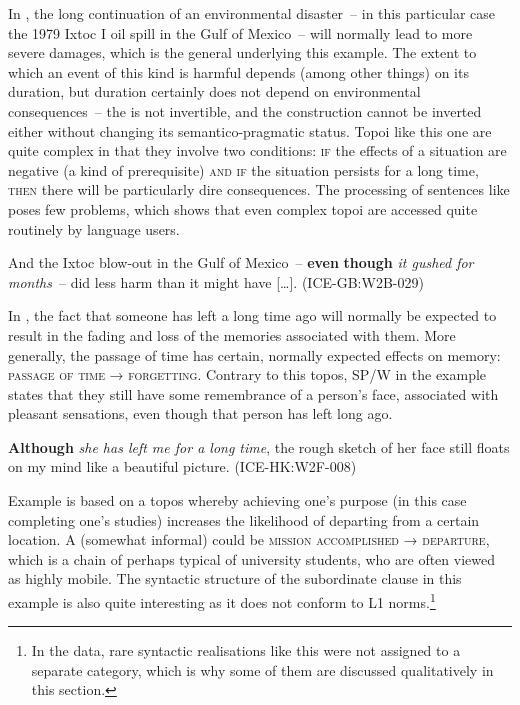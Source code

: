 In , the long continuation of an environmental disaster~– in this particular case the 1979 Ixtoc I oil spill in the Gulf of Mexico~– will normally lead to more severe damages, which is the general  underlying this example. The extent to which an event of this kind is harmful depends (among other things) on its duration, but duration certainly does not depend on environmental consequences~– the  is not invertible, and the construction cannot be inverted either without changing its semantico-pragmatic status. Topoi like this one are quite complex in that they involve two conditions: \textsc{if} the effects of a situation are negative (a kind of prerequisite) \textsc{and} \textsc{if} the situation persists for a long time, \textsc{then} there will be particularly dire consequences. The processing of sentences like  poses few problems, which shows that even complex topoi are accessed quite routinely by language users.

\ea\label{ex:41}   \label{bkm:Ref487277467}And the Ixtoc blow-out in the Gulf of Mexico~– \textbf{even} \textbf{though} \textit{it gushed for months}~– did less harm than it might have […]. (ICE-GB:W2B-029)
\z

In , the fact that someone has left a long time ago will normally be expected to result in the fading and loss of the memories associated with them. More generally, the passage of time has certain, normally expected effects on memory: \textsc{passage} \textsc{of} \textsc{time} → \textsc{forgetting}. Contrary to this topos, SP/W in the example states that they still have some remembrance of a person’s face, associated with pleasant sensations, even though that person has left long ago.

\ea\label{ex:42} \label{bkm:Ref488143559}  \textbf{Although} \textit{she has left me for a long time}, the rough sketch of her face still floats on my mind like a beautiful picture. (ICE-HK:W2F-008)
\z

Example  is based on a topos whereby achieving one’s purpose (in this case completing one’s studies) increases the likelihood of departing from a certain location. A (somewhat informal)  could be \textsc{mission} \textsc{accomplished} → \textsc{departure}, which is a chain of  perhaps typical of university students, who are often viewed as highly mobile. The syntactic structure of the subordinate clause in this example is also quite interesting as it does not conform to L1 norms.\footnote{In the data, rare syntactic realisations like this were not assigned to a separate category, which is why some of them are discussed qualitatively in this section.}

